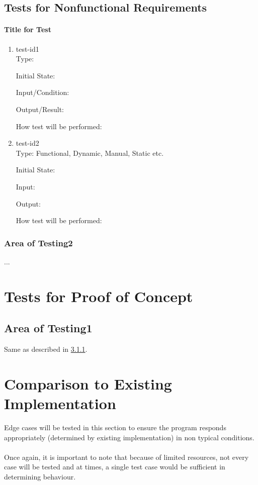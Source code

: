 \documentclass[12pt, titlepage]{article}
\begin{document}
	
\subsection{Tests for Nonfunctional Requirements}
		
\paragraph{Title for Test}
\begin{enumerate}
\item{test-id1\\}
Type: 
					
Initial State: 
					
Input/Condition: 
					
Output/Result: 
					
How test will be performed: 
					
\item{test-id2\\}
Type: Functional, Dynamic, Manual, Static etc.
					
Initial State: 
					
Input: 
					
Output: 
					
How test will be performed: 
\end{enumerate}
\subsubsection{Area of Testing2}
...
\section{Tests for Proof of Concept}
\subsection{Area of Testing1}
		
Same as described in \hyperref[sec:3.1.1]{3.1.1}.

\section{Comparison to Existing Implementation}	
Edge cases will be tested in this section to ensure the program responds appropriately (determined by existing implementation) in non typical conditions. \\ \\
Once again, it is important to note that because of limited resources, not every case will be tested and at times, a single test case would be sufficient in determining behaviour.	
\end{document}
